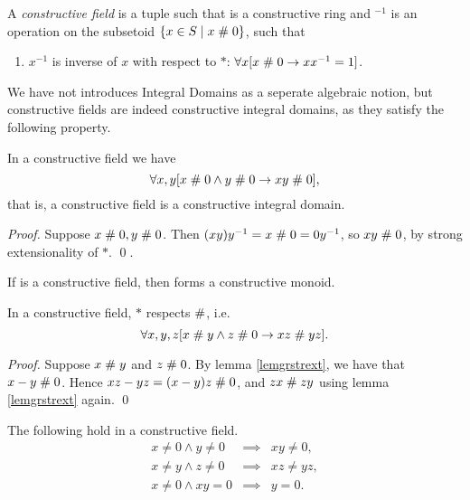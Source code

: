 \begin{definition}\label{deffield}
A {\em constructive field\/} is a tuple
 such that
 is a constructive ring and $^{-1}$ is an
operation on the subsetoid $\{x\in S\mid x\mathrel{\#} 0\}$, such that
\begin{enumerate}     
\item $x^{-1}$ is inverse of $x$ with respect to $*$:\quad
    $\forall x[x\mathrel{\#} 0 \rightarrow x x^{-1}=1]$.
\end{enumerate}
\end{definition}

We have not introduces Integral Domains as a seperate algebraic
notion, but constructive fields are indeed constructive integral
domains, as they satisfy the following property.

\begin{lemma}\label{lemidfield}
In a constructive field we have
$$\forall x,y [x\mathrel{\#} 0 \wedge y\mathrel{\#} 0 \rightarrow x y \mathrel{\#} 0],$$
that is, a constructive field is a constructive integral domain.
\end{lemma}

\begin{proof}
Suppose $x\mathrel{\#} 0, y\mathrel{\#} 0$. Then $(x y) y^{-1} =x \mathrel{\#} 0= 0 y^{-1}$, 
so $x y \mathrel{\#} 0$, by strong extensionality of $*$. \qed.  
\end{proof}

\begin{lemma}\label{nonzsetoid}
If  is a constructive field,
then  forms a
constructive monoid.
\end{lemma}

\begin{lemma}\label{intmulrespap}
In a constructive field, $*$ respects $\mathrel{\#}$, i.e.
\[
\forall x,y,z[x\mathrel{\#} y \wedge z\mathrel{\#} 0 \rightarrow x z \mathrel{\#} y z].
\]
\end{lemma}
\begin{proof}
  Suppose $x\mathrel{\#} y$ and $z\mathrel{\#} 0$. By lemma \ref{lemgrstrext}, we
  have that $x-y \mathrel{\#} 0$.  Hence $x z-y z=(x-y)z\mathrel{\#} 0$, and 
  $z x\mathrel{\#} z y$ using lemma \ref{lemgrstrext} again. \qed
\end{proof}


\begin{lemma}\label{lempropid}
The following hold in a constructive field.
\begin{eqnarray*}
x\neq 0 \wedge y\neq 0 &\implies& x y \neq 0,\\
x\neq y \wedge z\neq 0 &\implies& x z \neq y  z,\\
x\neq0 \wedge x y = 0 &\implies & y=0.
\end{eqnarray*}
\end{lemma}

